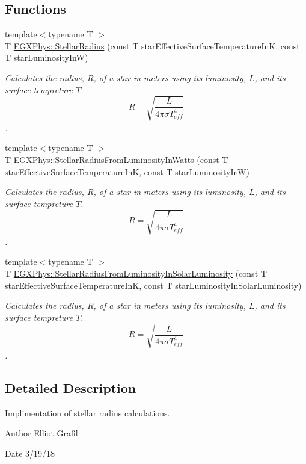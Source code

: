 \subsection*{Functions}
\begin{DoxyCompactItemize}
\item 
{\footnotesize template$<$typename T $>$ }\\T \mbox{\hyperlink{group___e_g_x_phys-_stellar_radius_ga612cd22c37341a1864cd2fc5c858e18e}{E\+G\+X\+Phys\+::\+Stellar\+Radius}} (const T star\+Effective\+Surface\+Temperature\+InK, const T star\+Luminosity\+InW)
\begin{DoxyCompactList}\small\item\em Calculates the radius, $R$, of a star in meters using its luminosity, $L$, and its surface tempreture $T$. \[R=\sqrt{\dfrac{L}{4\pi \sigma T_{eff}^4}}\]. \end{DoxyCompactList}\item 
{\footnotesize template$<$typename T $>$ }\\T \mbox{\hyperlink{group___e_g_x_phys-_stellar_radius_ga59f0d5d89a857d30bff4c93713ee5bd9}{E\+G\+X\+Phys\+::\+Stellar\+Radius\+From\+Luminosity\+In\+Watts}} (const T star\+Effective\+Surface\+Temperature\+InK, const T star\+Luminosity\+InW)
\begin{DoxyCompactList}\small\item\em Calculates the radius, $R$, of a star in meters using its luminosity, $L$, and its surface tempreture $T$. \[R=\sqrt{\dfrac{L}{4\pi \sigma T_{eff}^4}}\]. \end{DoxyCompactList}\item 
{\footnotesize template$<$typename T $>$ }\\T \mbox{\hyperlink{group___e_g_x_phys-_stellar_radius_ga49f0848777ba12cdfc78d112d82036ce}{E\+G\+X\+Phys\+::\+Stellar\+Radius\+From\+Luminosity\+In\+Solar\+Luminosity}} (const T star\+Effective\+Surface\+Temperature\+InK, const T star\+Luminosity\+In\+Solar\+Luminosity)
\begin{DoxyCompactList}\small\item\em Calculates the radius, $R$, of a star in meters using its luminosity, $L$, and its surface tempreture $T$. \[R=\sqrt{\dfrac{L}{4\pi \sigma T_{eff}^4}}\]. \end{DoxyCompactList}\end{DoxyCompactItemize}


\subsection{Detailed Description}
Implimentation of stellar radius calculations. 

\begin{DoxyAuthor}{Author}
Elliot Grafil 
\end{DoxyAuthor}
\begin{DoxyDate}{Date}
3/19/18 
\end{DoxyDate}
